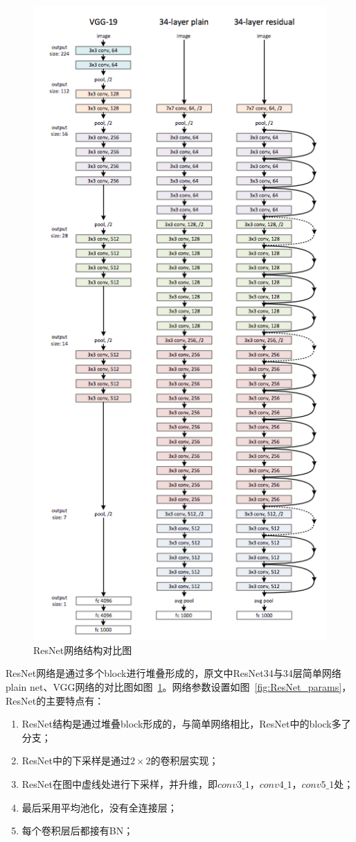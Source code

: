 \begin{figure}[htbp]
	\centering
	\includegraphics[width=0.8\linewidth]{readings_figures/ResNet_net.jpeg}
	\caption{ResNet网络结构对比图}
	\label{fig:ResNet_net}
\end{figure}


ResNet网络是通过多个block进行堆叠形成的，原文中ResNet34与34层简单网络plain net、VGG网络的对比图如图~\ref{fig:ResNet_net}。网络参数设置如图~\ref{fig:ResNet_params}，ResNet的主要特点有：

\begin{enumerate}
	\item ResNet结构是通过堆叠block形成的，与简单网络相比，ResNet中的block多了分支；
	\item ResNet中的下采样是通过$2\times2$的卷积层实现；
	\item ResNet在图中虚线处进行下采样，并升维，即$conv3\_1$，$conv4\_1$，$conv5\_1$处；
	\item 最后采用平均池化，没有全连接层；
	\item 每个卷积层后都接有BN；
\end{enumerate}

